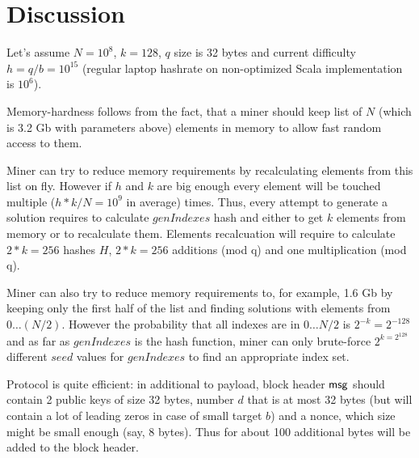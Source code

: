 \documentclass[]{article}
\begin{document}
    \section{Discussion}

    Let's assume $N=10^8$, $k=128$, $q$ size is 32 bytes and current difficulty
    $h = q / b = 10^{15}$ (regular laptop hashrate on non-optimized Scala implementation is $10^6$).

    Memory-hardness follows from the fact, that a miner should keep list of $N$
    (which is 3.2 Gb with parameters above) elements in memory to allow fast random access to them.

    Miner can try to reduce memory requirements by recalculating elements from this list on fly.
    However if $h$ and $k$ are big enough
    every element will be touched multiple ($h * k / N = 10^9$ in average) times.
    Thus, every attempt to generate a solution requires to calculate $genIndexes$ hash and
    either to get $k$ elements from memory or to recalculate them.
    Elements recalcuation will require to calculate $2 * k = 256$ hashes $H$,
    $2 * k = 256$ additions (mod q) and one multiplication (mod q).

    Miner can also try to reduce memory requirements to, for example, 1.6 Gb
    by keeping only the first half of the list and finding solutions
    with elements from $0 \dots (N/2)$.
    However the probability that all indexes are in $0 \dots N/2$ is
    $2^{-k}=2^{-128}$ and as far as $genIndexes$
    is the hash function, miner can only brute-force $2^{k=2^{128}}$ different $seed$ values for $genIndexes$
    to find an appropriate index set.

    Protocol is quite efficient: in additional to payload, block header $\mathsf{msg}$ should
    contain 2 public keys of size 32 bytes, number $d$ that is at most 32 bytes
    (but will contain a lot of leading zeros in case of small target $b$) and a nonce,
    which size might be small enough (say, 8 bytes). Thus for about 100 additional bytes
    will be added to the block header.

\end{document}
